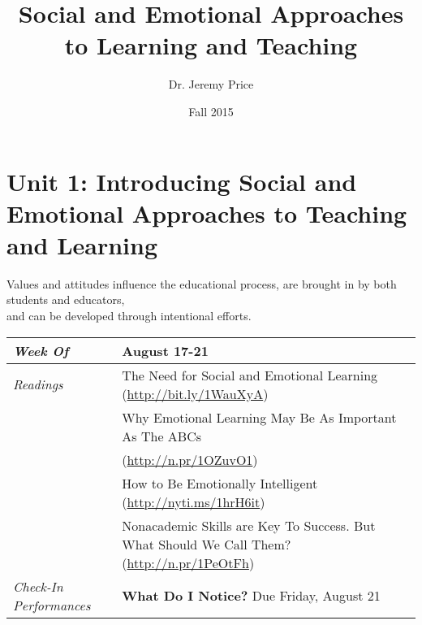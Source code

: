 \documentclass{article}
\title{Social and Emotional Approaches to Learning and Teaching}
\author{Dr. Jeremy Price}
\date{Fall 2015}  %
\newcommand{\gentopic}[1]{\begin{center}\faKey \textsf{#1}\end{center}}
\newcommand{\tabread}{\faBook\medspace\textit{Readings}}
\newcommand{\tabdt}{\faCalendar\medspace\textit{Week Of}}
\newcommand{\tabcheckin}{\faCheckSquareO\medspace\textit{Check-In Performances}}
\newenvironment{tabsched}
	{\small
	\begin{tabular}{p{1.5in}p{4.5in}}
	\midrule}
	{\midrule
	\end{tabular}
	\normalsize}
\newcommand{\weekone}{August 17-21}
\begin{document}
\section{Unit 1: Introducing Social and Emotional Approaches to Teaching and Learning}

\gentopic{Values and attitudes influence the educational process, are brought in by both students and educators,\\and can be developed through intentional efforts.}


\begin{tabsched}
	\tabdt & \weekone \\
	\midrule
	\tabread & The Need for Social and Emotional Learning (\url{http://bit.ly/1WauXyA}) \\
	& Why Emotional Learning May Be As Important As The ABCs \\
	& (\url{http://n.pr/1OZuvO1}) \\
	& How to Be Emotionally Intelligent (\url{http://nyti.ms/1hrH6it}) \\
	& Nonacademic Skills are Key To Success. But What Should We Call Them?  (\url{http://n.pr/1PeOtFh}) \\
	\midrule
	\tabcheckin & \textbf{What Do I Notice?} Due Friday, August 21 \\
\end{tabsched}
\end{document}
